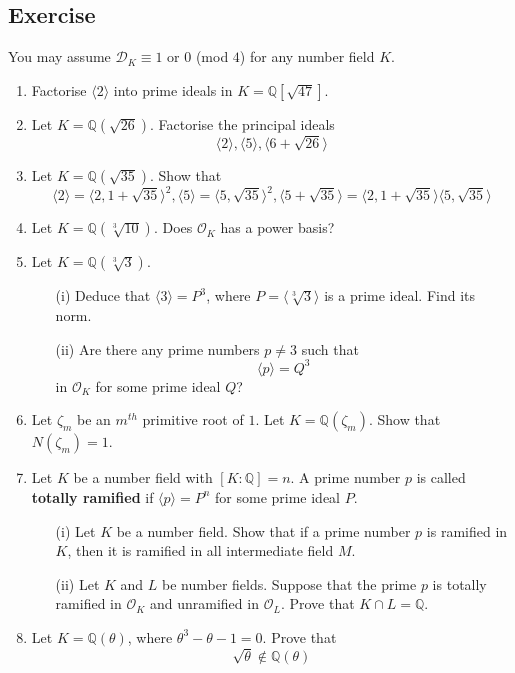 \subsection{Exercise}
You may assume $\mathcal{D}_K \equiv 1$ or $0$ (mod $4$) for any number field $K$.
\begin{enumerate}
\item Factorise $\langle 2 \rangle$ into prime ideals in $K=\mathbb{Q}[\sqrt{47}]$.
\item Let $K=\mathbb{Q}(\sqrt{26})$. Factorise the principal ideals
$$\langle 2 \rangle, \langle 5 \rangle, \langle 6+\sqrt{26} \rangle$$
\item Let $K=\mathbb{Q}(\sqrt{35})$. Show that
$$\langle 2 \rangle=\langle 2,1+\sqrt{35} \rangle^2, \langle 5 \rangle =\langle 5,\sqrt{35} \rangle^2,
\langle 5+\sqrt{35} \rangle=\langle 2,1+\sqrt{35} \rangle \langle 5,\sqrt{35} \rangle$$
\item Let $K=\mathbb{Q}(\sqrt[3]{10})$. Does $\mathcal{O}_K$ has a power basis?
\item Let $K=\mathbb{Q}(\sqrt[3]{3})$.
\begin{enumerate}
\item[(i)] Deduce that $\langle 3 \rangle =P^3$, where $P=\langle \sqrt[3]{3} \rangle$ is a prime ideal. Find its norm.
\item[(ii)] Are there any prime numbers $p \neq 3$ such that
$$\langle p \rangle=Q^3$$
in $\mathcal{O}_K$ for some prime ideal $Q$?
\end{enumerate}
\item Let $\zeta_m$ be an $m^{th}$ primitive root of $1$. Let $K=\mathbb{Q}(\zeta_m)$. Show that
$N(\zeta_m)=1$.\\
\item Let $K$ be a number field with $[K:\mathbb{Q}]=n$. A prime number $p$ is called {\bf totally ramified} if $\langle p \rangle=P^n$ for some prime ideal $P$.
\begin{enumerate}
\item[(i)] Let $K$ be a number field. Show that if a prime number $p$ is ramified in $K$, then it is
ramified in all intermediate field $M$.\\
\item[(ii)] Let $K$ and $L$ be number fields. Suppose that the prime $p$ is totally ramified in $\mathcal{O}_{K}$ and unramified in $\mathcal{O}_L$. Prove that $K \cap L=\mathbb{Q}$.\\
\end{enumerate}
\item Let $K=\mathbb{Q}(\theta)$, where $\theta^3-\theta-1=0$. Prove that $$\sqrt{\theta} \not \in \mathbb{Q}(\theta)$$

\end{enumerate}
